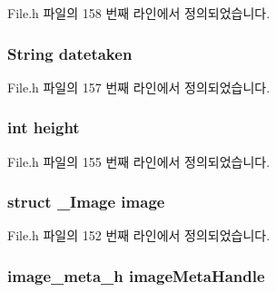 File.\-h 파일의 158 번째 라인에서 정의되었습니다.

\hypertarget{struct__ImageExtends_a077fc46f97fd76e21ef941afe99e6eaa}{
\subsubsection[{datetaken}]{\setlength{\rightskip}{0pt plus 5cm}String datetaken}}\label{struct__ImageExtends_a077fc46f97fd76e21ef941afe99e6eaa}


File.\-h 파일의 157 번째 라인에서 정의되었습니다.

\hypertarget{struct__ImageExtends_ad12fc34ce789bce6c8a05d8a17138534}{
\subsubsection[{height}]{\setlength{\rightskip}{0pt plus 5cm}int height}}\label{struct__ImageExtends_ad12fc34ce789bce6c8a05d8a17138534}


File.\-h 파일의 155 번째 라인에서 정의되었습니다.

\hypertarget{struct__ImageExtends_a24c96542e7d59186d5d414503928920a}{
\subsubsection[{image}]{\setlength{\rightskip}{0pt plus 5cm}struct {\bf \-\_\-\-Image} image}}\label{struct__ImageExtends_a24c96542e7d59186d5d414503928920a}


File.\-h 파일의 152 번째 라인에서 정의되었습니다.

\hypertarget{struct__ImageExtends_a9cb994692e8daaf094623152f5f88d53}{
\subsubsection[{image\-Meta\-Handle}]{\setlength{\rightskip}{0pt plus 5cm}image\-\_\-meta\-\_\-h image\-Meta\-Handle}}\label{struct__ImageExtends_a9cb994692e8daaf094623152f5f88d53}


